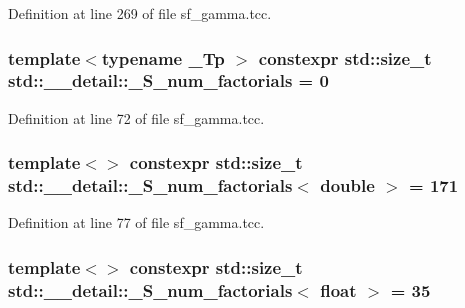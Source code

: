 Definition at line 269 of file sf\+\_\+gamma.\+tcc.

\subsubsection[{\texorpdfstring{\+\_\+\+S\+\_\+num\+\_\+factorials}{_S_num_factorials}}]{\setlength{\rightskip}{0pt plus 5cm}template$<$typename \+\_\+\+Tp $>$ constexpr std\+::size\+\_\+t std\+::\+\_\+\+\_\+detail\+::\+\_\+\+S\+\_\+num\+\_\+factorials = 0}\hypertarget{namespacestd_1_1____detail_a671f3ba94c1b06be87992486bca37426}{}\label{namespacestd_1_1____detail_a671f3ba94c1b06be87992486bca37426}


Definition at line 72 of file sf\+\_\+gamma.\+tcc.

\subsubsection[{\texorpdfstring{\+\_\+\+S\+\_\+num\+\_\+factorials$<$ double $>$}{_S_num_factorials< double >}}]{\setlength{\rightskip}{0pt plus 5cm}template$<$$>$ constexpr std\+::size\+\_\+t {\bf std\+::\+\_\+\+\_\+detail\+::\+\_\+\+S\+\_\+num\+\_\+factorials}$<$ double $>$ = 171}\hypertarget{namespacestd_1_1____detail_ad415b9ec36471d7aca4ebcd22cb7b216}{}\label{namespacestd_1_1____detail_ad415b9ec36471d7aca4ebcd22cb7b216}


Definition at line 77 of file sf\+\_\+gamma.\+tcc.

\subsubsection[{\texorpdfstring{\+\_\+\+S\+\_\+num\+\_\+factorials$<$ float $>$}{_S_num_factorials< float >}}]{\setlength{\rightskip}{0pt plus 5cm}template$<$$>$ constexpr std\+::size\+\_\+t {\bf std\+::\+\_\+\+\_\+detail\+::\+\_\+\+S\+\_\+num\+\_\+factorials}$<$ float $>$ = 35}\hypertarget{namespacestd_1_1____detail_a3a29651303ca2222246ef6f0a17e92ec}{}\label{namespacestd_1_1____detail_a3a29651303ca2222246ef6f0a17e92ec}


